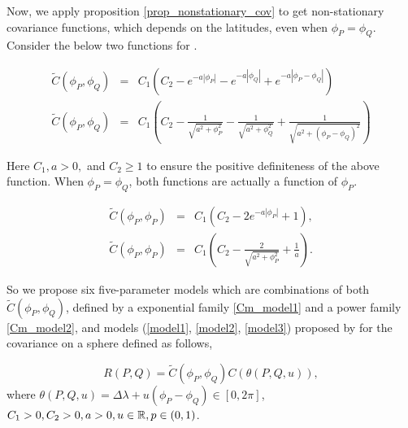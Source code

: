 Now, we apply proposition \ref{prop_nonstationary_cov} to get non-stationary covariance functions, which depends on the latitudes, even when $\phi_P = \phi_Q$. Consider the below two functions for \Cm.
		      		      
		      \begin{eqnarray}
		      	\label{Cm_model1}
		      	\tilde{C}(\phi_P, \phi_Q) &=& C_1(C_2 - e^{-a|\phi_P|} - e^{-a|\phi_Q|} + e^{-a|\phi_P - \phi_Q|}) \\
		      	\label{Cm_model2}
		      	\tilde{C}(\phi_P, \phi_Q) &=& C_1\left(C_2 - \frac{1}{\sqrt{a^2+\phi_P^2}} - \frac{1}{\sqrt{a^2+\phi_Q^2}} + \frac{1}{\sqrt{a^2+(\phi_P-\phi_Q)^2}}\right)
		      \end{eqnarray}
		      		      
		      Here $C_1, a > 0,$ and $C_2 \ge 1$ to ensure the positive definiteness of the above function. When $\phi_P = \phi_Q$, both functions are actually a function of $\phi_P$.
		      		      
		      \begin{eqnarray*}
		      	\tilde{C}(\phi_P, \phi_P) &=& C_1(C_2 - 2e^{-a|\phi_P|} + 1), \\
		      	\tilde{C}(\phi_P, \phi_P) &=& C_1\left(C_2 - \frac{2}{\sqrt{a^2+\phi_P^2}} + \frac{1}{a}\right).
		      \end{eqnarray*}


		
So we propose six five-parameter models which are combinations of both $\tilde{C}(\phi_P, \phi_Q)$, defined by a exponential family \ref{Cm_model1} and a power family \ref{Cm_model2}, and models (\ref{model1}, \ref{model2}, \ref{model3}) proposed by \cite{Huang2012} for the covariance on a sphere defined as follows,
		
	\[
		R(P,Q) = \tilde{C}(\phi_P, \phi_Q) C(\theta(P,Q,u)),
	\]
	where $\theta(P,Q,u)=\Delta\lambda+u(\phi_P-\phi_Q) \in [0,2\pi ] $, $C_1 > 0, C_2 > 0, a>0, u\in \mathbb{R}, p\in(0,1)$. 
		
